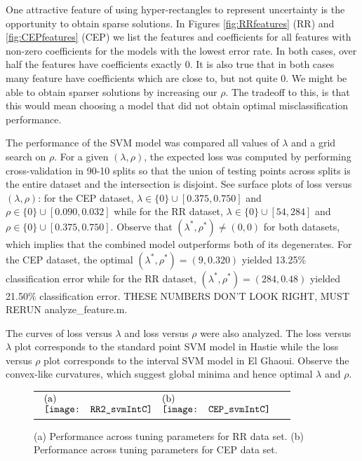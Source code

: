 \documentclass[10pt]{article}
\theoremstyle{definition}
\begin{document}
One attractive feature of using hyper-rectangles to represent uncertainty is the opportunity to obtain sparse solutions. In Figures \ref{fig:RRfeatures} (RR) and \ref{fig:CEPfeatures} (CEP) we list the features and coefficients for all features with non-zero coefficients for the models with the lowest error rate. In both cases, over half the features have coefficients exactly 0. It is also true that in both cases many feature have coefficients which are close to, but not quite 0. We might be able to obtain sparser solutions by increasing our $\rho$. The tradeoff to this, is that this would mean choosing a model that did not obtain optimal misclassification performance.

The performance of the SVM model was compared  all values of $\lambda$ and a grid search on $\rho$.  For a given $(\lambda,\rho)$, the expected loss was computed by performing cross-validation in 90-10 splits so that the union of testing points across splits is the entire dataset and the intersection is disjoint. See surface plots of loss versus $(\lambda,\rho)$: for the CEP dataset, $\lambda\in \lbrace 0\rbrace\cup [0.375,0.750]$ and $\rho\in\lbrace 0\rbrace\cup [0.090,0.032]$ while for the RR dataset, $\lambda\in\lbrace 0\rbrace\cup [54,284]$ and $\rho\in\lbrace 0\rbrace\cup [0.375,0.750]$. Observe that $(\lambda^*,\rho^*)\neq (0,0)$ for both datasets, which implies that the combined model outperforms both of its degenerates. For the CEP dataset, the optimal $(\lambda^*,\rho^*)=(9,0.320)$ yielded 13.25\% classification error while for the RR dataset, $(\lambda^*,\rho^*)=(284,0.48)$ yielded 21.50\% classification error. THESE NUMBERS DON'T LOOK RIGHT, MUST RERUN analyze\_feature.m.

The curves of loss versus $\lambda$ and loss versus $\rho$ were also analyzed.  The loss versus $\lambda$ plot corresponds to the standard point SVM model in Hastie while the loss versus $\rho$ plot corresponds to the interval SVM model in El Ghaoui. Observe the convex-like curvatures, which suggest global minima and hence optimal $\lambda$ and $\rho$. 


\begin{figure}[ht]
\begin{center}
\begin{tabular}{cc}
$\begin{array}{cc}
\multicolumn{1}{l}{\mbox{(a)}} & \multicolumn{1}{l}{\mbox{(b)}} \\ \\ \\ [-.35in]
\texttt{[image: RR2\_svmIntC]} &
\texttt{[image: CEP\_svmIntC]}
\end{array}$
\end{tabular}
\end{center}
\caption{(a) Performance across tuning parameters for RR data set. (b) Performance across tuning parameters for CEP data set.}
\label{fig:regularizations}
\end{figure}
\end{document}
